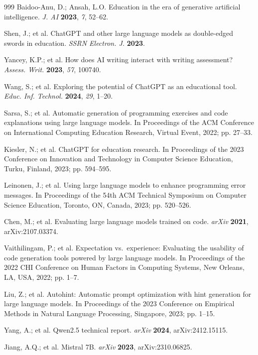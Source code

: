 \documentclass[journal,article,submit,pdftex,moreauthors]{Definitions/mdpi}
\begin{document}
\begin{thebibliography}{999}
Baidoo-Anu, D.; Ansah, L.O. Education in the era of generative artificial intelligence. \textit{J. AI} \textbf{2023}, \textit{7}, 52--62.

Shen, J.; et al. ChatGPT and other large language models as double-edged swords in education. \textit{SSRN Electron. J.} \textbf{2023}.

Yancey, K.P.; et al. How does AI writing interact with writing assessment? \textit{Assess. Writ.} \textbf{2023}, \textit{57}, 100740.

Wang, S.; et al. Exploring the potential of ChatGPT as an educational tool. \textit{Educ. Inf. Technol.} \textbf{2024}, \textit{29}, 1--20.

Sarsa, S.; et al. Automatic generation of programming exercises and code explanations using large language models. In Proceedings of the ACM Conference on International Computing Education Research, Virtual Event, 2022; pp. 27--33.

Kiesler, N.; et al. ChatGPT for education research. In Proceedings of the 2023 Conference on Innovation and Technology in Computer Science Education, Turku, Finland, 2023; pp. 594--595.

Leinonen, J.; et al. Using large language models to enhance programming error messages. In Proceedings of the 54th ACM Technical Symposium on Computer Science Education, Toronto, ON, Canada, 2023; pp. 520--526.

Chen, M.; et al. Evaluating large language models trained on code. \textit{arXiv} \textbf{2021}, arXiv:2107.03374.

Vaithilingam, P.; et al. Expectation vs.\ experience: Evaluating the usability of code generation tools powered by large language models. In Proceedings of the 2022 CHI Conference on Human Factors in Computing Systems, New Orleans, LA, USA, 2022; pp. 1--7.

Liu, Z.; et al. Autohint: Automatic prompt optimization with hint generation for large language models. In Proceedings of the 2023 Conference on Empirical Methods in Natural Language Processing, Singapore, 2023; pp. 1--15.

Yang, A.; et al. Qwen2.5 technical report. \textit{arXiv} \textbf{2024}, arXiv:2412.15115.

Jiang, A.Q.; et al. Mistral 7B. \textit{arXiv} \textbf{2023}, arXiv:2310.06825.


\end{thebibliography}
\end{document}
